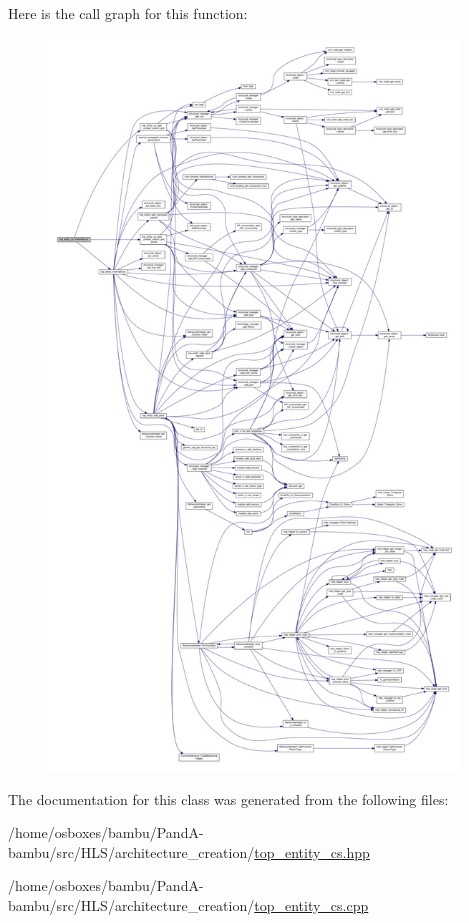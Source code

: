 Here is the call graph for this function\+:
\nopagebreak
\begin{figure}[H]
\begin{center}
\leavevmode
\includegraphics[height=550pt]{d5/d78/classtop__entity__cs_a5d81c98939f48e4bdd7fe81f651000a2_cgraph}
\end{center}
\end{figure}


The documentation for this class was generated from the following files\+:\begin{DoxyCompactItemize}
\item 
/home/osboxes/bambu/\+Pand\+A-\/bambu/src/\+H\+L\+S/architecture\+\_\+creation/\hyperlink{top__entity__cs_8hpp}{top\+\_\+entity\+\_\+cs.\+hpp}\item 
/home/osboxes/bambu/\+Pand\+A-\/bambu/src/\+H\+L\+S/architecture\+\_\+creation/\hyperlink{top__entity__cs_8cpp}{top\+\_\+entity\+\_\+cs.\+cpp}\end{DoxyCompactItemize}
